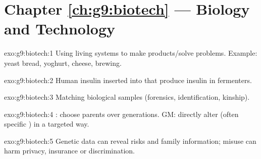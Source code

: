 \section*{Chapter \ref{ch:g9:biotech} --- Biology and Technology}

\begin{solution}{exo:g9:biotech:1}
Using living systems to make products/solve problems. Example: yeast bread,
yoghurt, cheese, brewing.
\end{solution}

\begin{solution}{exo:g9:biotech:2}
Human insulin  inserted into  that produce insulin  in
fermenters.
\end{solution}

\begin{solution}{exo:g9:biotech:3}
Matching biological samples (forensics, identification, kinship).
\end{solution}

\begin{solution}{exo:g9:biotech:4}
: choose parents over generations. GM: directly alter
 (often specific ) in a targeted way.
\end{solution}

\begin{solution}{exo:g9:biotech:5}
Genetic data can reveal  risks and family information; misuse can
harm privacy, insurance or discrimination.
\end{solution}


